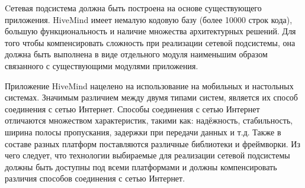 Cетевая подсистема должна быть построена на основе существующего приложения.
HiveMind имеет немалую кодовую базу (более 10000 строк кода), большую
функциональность и наличие множества архитектурных решений. Для того чтобы
компенсировать сложность при реализации сетевой подсистемы, она должна быть
выполнена в виде отдельного модуля наименьшим образом связанного с существующими
модулями приложения.

Приложение HiveMind нацелено на использование на мобильных и настольных
системах. Значимым различием между двумя типами систем, является их способ
соединения с сетью Интернет. Способы соединения с сетью Интернет отличаются
множеством характеристик, такими как: надёжность, стабильность, ширина
полосы пропускания, задержки при передачи данных и т.д. Также в составе разных
платформ поставляются различные библиотеки и фреймворки. Из чего следует, что
технологии выбираемые для реализации сетевой подсистемы должны быть доступны под
всеми платформами и должны компенсировать различия способов соединения с сетью
Интернет.
